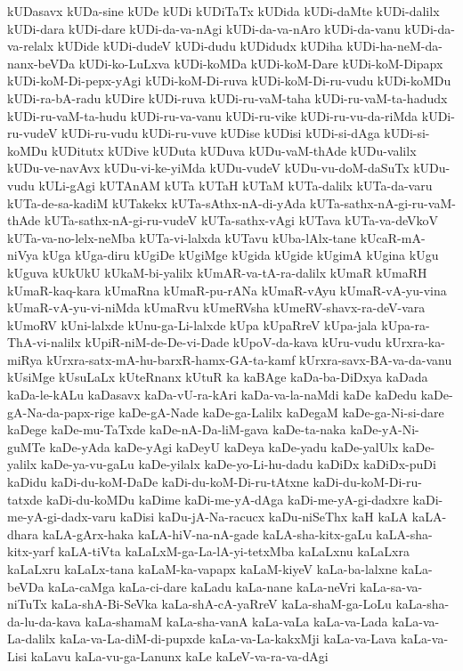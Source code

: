 {kUDasavx
kUDa-sine
kUDe
kUDi
kUDiTaTx
kUDida
kUDi-daMte
kUDi-dalilx
kUDi-dara
kUDi-dare
kUDi-da-va-nAgi
kUDi-da-va-nAro
kUDi-da-vanu
kUDi-da-va-relalx
kUDide
kUDi-dudeV
kUDi-dudu
kUDidudx
kUDiha
kUDi-ha-neM-da-nanx-beVDa
kUDi-ko-LuLxva
kUDi-koMDa
kUDi-koM-Dare
kUDi-koM-Dipapx
kUDi-koM-Di-pepx-yAgi
kUDi-koM-Di-ruva
kUDi-koM-Di-ru-vudu
kUDi-koMDu
kUDi-ra-bA-radu
kUDire
kUDi-ruva
kUDi-ru-vaM-taha
kUDi-ru-vaM-ta-hadudx
kUDi-ru-vaM-ta-hudu
kUDi-ru-va-vanu
kUDi-ru-vike
kUDi-ru-vu-da-riMda
kUDi-ru-vudeV
kUDi-ru-vudu
kUDi-ru-vuve
kUDise
kUDisi
kUDi-si-dAga
kUDi-si-koMDu
kUDitutx
kUDive
kUDuta
kUDuva
kUDu-vaM-thAde
kUDu-valilx
kUDu-ve-navAvx
kUDu-vi-ke-yiMda
kUDu-vudeV
kUDu-vu-doM-daSuTx
kUDu-vudu
kULi-gAgi
kUTAnAM
kUTa
kUTaH
kUTaM
kUTa-dalilx
kUTa-da-varu
kUTa-de-sa-kadiM
kUTakekx
kUTa-sAthx-nA-di-yAda
kUTa-sathx-nA-gi-ru-vaM-thAde
kUTa-sathx-nA-gi-ru-vudeV
kUTa-sathx-vAgi
kUTava
kUTa-va-deVkoV
kUTa-va-no-lelx-neMba
kUTa-vi-lalxda
kUTavu
kUba-lAlx-tane
kUcaR-mA-niVya
kUga
kUga-diru
kUgiDe
kUgiMge
kUgida
kUgide
kUgimA
kUgina
kUgu
kUguva
kUkUkU
kUkaM-bi-yalilx
kUmAR-va-tA-ra-dalilx
kUmaR
kUmaRH
kUmaR-kaq-kara
kUmaRna
kUmaR-pu-rANa
kUmaR-vAyu
kUmaR-vA-yu-vina
kUmaR-vA-yu-vi-niMda
kUmaRvu
kUmeRVsha
kUmeRV-shavx-ra-deV-vara
kUmoRV
kUni-lalxde
kUnu-ga-Li-lalxde
kUpa
kUpaRreV
kUpa-jala
kUpa-ra-ThA-vi-nalilx
kUpiR-niM-de-De-vi-Dade
kUpoV-da-kava
kUru-vudu
kUrxra-ka-miRya
kUrxra-satx-mA-hu-barxR-hamx-GA-ta-kamf
kUrxra-savx-BA-va-da-vanu
kUsiMge
kUsuLaLx
kUteRnanx
kUtuR
ka
kaBAge
kaDa-ba-DiDxya
kaDada
kaDa-le-kALu
kaDasavx
kaDa-vU-ra-kAri
kaDa-va-la-naMdi
kaDe
kaDedu
kaDe-gA-Na-da-papx-rige
kaDe-gA-Nade
kaDe-ga-Lalilx
kaDegaM
kaDe-ga-Ni-si-dare
kaDege
kaDe-mu-TaTxde
kaDe-nA-Da-liM-gava
kaDe-ta-naka
kaDe-yA-Ni-guMTe
kaDe-yAda
kaDe-yAgi
kaDeyU
kaDeya
kaDe-yadu
kaDe-yalUlx
kaDe-yalilx
kaDe-ya-vu-gaLu
kaDe-yilalx
kaDe-yo-Li-hu-dadu
kaDiDx
kaDiDx-puDi
kaDidu
kaDi-du-koM-DaDe
kaDi-du-koM-Di-ru-tAtxne
kaDi-du-koM-Di-ru-tatxde
kaDi-du-koMDu
kaDime
kaDi-me-yA-dAga
kaDi-me-yA-gi-dadxre
kaDi-me-yA-gi-dadx-varu
kaDisi
kaDu-jA-Na-racucx
kaDu-niSeThx
kaH
kaLA
kaLA-dhara
kaLA-gArx-haka
kaLA-hiV-na-nA-gade
kaLA-sha-kitx-gaLu
kaLA-sha-kitx-yarf
kaLA-tiVta
kaLaLxM-ga-La-lA-yi-tetxMba
kaLaLxnu
kaLaLxra
kaLaLxru
kaLaLx-tana
kaLaM-ka-vapapx
kaLaM-kiyeV
kaLa-ba-lalxne
kaLa-beVDa
kaLa-caMga
kaLa-ci-dare
kaLadu
kaLa-nane
kaLa-neVri
kaLa-sa-va-niTuTx
kaLa-shA-Bi-SeVka
kaLa-shA-cA-yaRreV
kaLa-shaM-ga-LoLu
kaLa-sha-da-lu-da-kava
kaLa-shamaM
kaLa-sha-vanA
kaLa-vaLa
kaLa-va-Lada
kaLa-va-La-dalilx
kaLa-va-La-diM-di-pupxde
kaLa-va-La-kakxMji
kaLa-va-Lava
kaLa-va-Lisi
kaLavu
kaLa-vu-ga-Lanunx
kaLe
kaLeV-va-ra-va-dAgi
}
